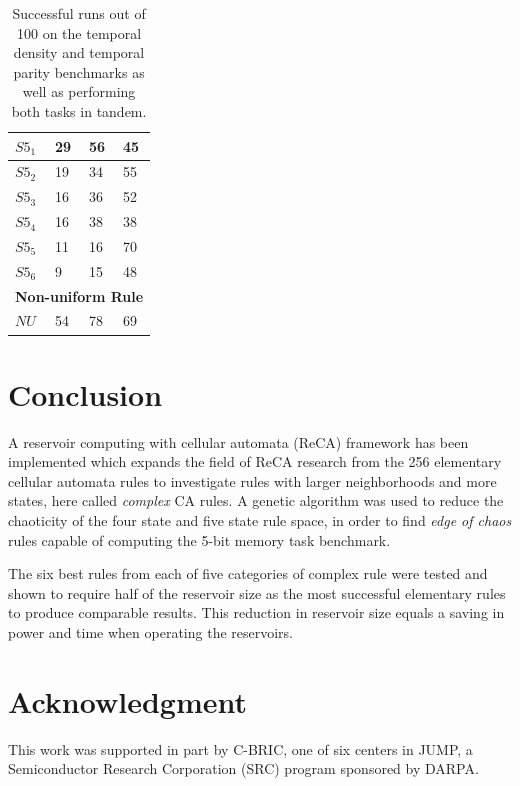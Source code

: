 \documentclass{elsarticle}
\begin{document}
\begin{multicols}{2}
\begin{table}[H]
\begin{tabular}{|l|l|l|l|}
\hline
$S5_{1}$ & 29 & 56 & 45 \\ \hline
$S5_{2}$ & 19 & 34 & 55 \\ \hline
$S5_{3}$ & 16 & 36 & 52 \\ \hline
$S5_{4}$ & 16 & 38 & 38 \\ \hline
$S5_{5}$ & 11 & 16 & 70 \\ \hline
$S5_{6}$ & 9 & 15 & 48 \\ \hline
\multicolumn{4}{|l|}{\textbf{Non-uniform Rule}} \\ \hline
$NU$ & 54 & 78 & 69 \\ \hline
\end{tabular}
\caption{Successful runs out of 100 on the temporal density and temporal parity 
   benchmarks as well as performing both tasks in tandem.
}
\label{table:results_temp_dens}
\end{table}

\section{Conclusion}\label{conclusion}
A reservoir computing with cellular automata (ReCA) framework has been 
implemented which expands the field of ReCA research from the 256 elementary 
cellular automata rules to investigate rules with larger neighborhoods and more 
states, here called \textit{complex} CA rules. A genetic algorithm was used to 
reduce the chaoticity of the four state and five state rule space, in order to 
find \textit{edge of chaos} rules capable of computing the 5-bit memory task 
benchmark. \par The six best rules from each of five categories of complex rule 
were tested and shown to require half of the reservoir size as the most 
successful elementary rules to produce comparable results. This reduction in 
reservoir size equals a saving in power and time when operating the reservoirs.  


\section{Acknowledgment}
This work was supported in part by C-BRIC, one of six centers in JUMP, a 
Semiconductor Research Corporation (SRC) program sponsored by DARPA.




\end{multicols}
\end{document}
